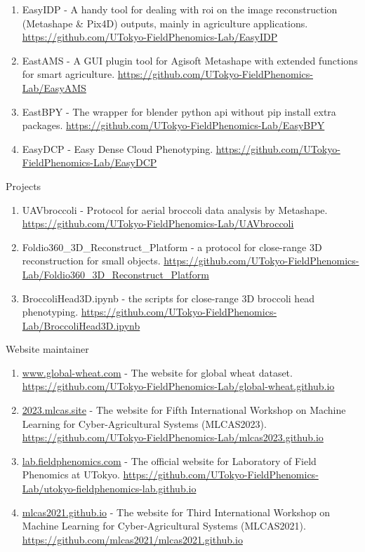 \begin{singlespace}
\begin{enumerate}
  \item EasyIDP - A handy tool for dealing with \gls{roi} on the image reconstruction (Metashape \& Pix4D) outputs, mainly in agriculture applications. \url{https://github.com/UTokyo-FieldPhenomics-Lab/EasyIDP}
  \item EastAMS - A GUI plugin tool for Agisoft Metashape with extended functions for smart agriculture. \url{https://github.com/UTokyo-FieldPhenomics-Lab/EasyAMS}
  \item EastBPY - The wrapper for blender python \gls{api} without pip install extra packages. \url{https://github.com/UTokyo-FieldPhenomics-Lab/EasyBPY}
  \item EasyDCP - Easy Dense Cloud Phenotyping. \url{https://github.com/UTokyo-FieldPhenomics-Lab/EasyDCP}
\end{enumerate}

\noindent
Projects

\begin{enumerate}
  \item UAVbroccoli - Protocol for aerial broccoli data analysis by Metashape. \url{https://github.com/UTokyo-FieldPhenomics-Lab/UAVbroccoli}
  \item Foldio360\_3D\_Reconstruct\_Platform - a protocol for close-range 3D reconstruction for small objects. \url{https://github.com/UTokyo-FieldPhenomics-Lab/Foldio360_3D_Reconstruct_Platform}
  \item BroccoliHead3D.ipynb - the scripts for close-range 3D broccoli head phenotyping. \url{https://github.com/UTokyo-FieldPhenomics-Lab/BroccoliHead3D.ipynb}
\end{enumerate}

\noindent
Website maintainer

\begin{enumerate}
  \item \url{www.global-wheat.com} - The website for global wheat dataset. \url{https://github.com/UTokyo-FieldPhenomics-Lab/global-wheat.github.io}
  \item \url{2023.mlcas.site} - The website for Fifth International Workshop on Machine Learning for Cyber-Agricultural Systems (MLCAS2023). \url{https://github.com/UTokyo-FieldPhenomics-Lab/mlcas2023.github.io}
  \item \url{lab.fieldphenomics.com} - The official website for Laboratory of Field Phenomics at UTokyo. \url{https://github.com/UTokyo-FieldPhenomics-Lab/utokyo-fieldphenomics-lab.github.io}
  \item \url{mlcas2021.github.io} - The website for Third International Workshop on Machine Learning for Cyber-Agricultural Systems (MLCAS2021). \url{https://github.com/mlcas2021/mlcas2021.github.io}
\end{enumerate}

\end{singlespace}